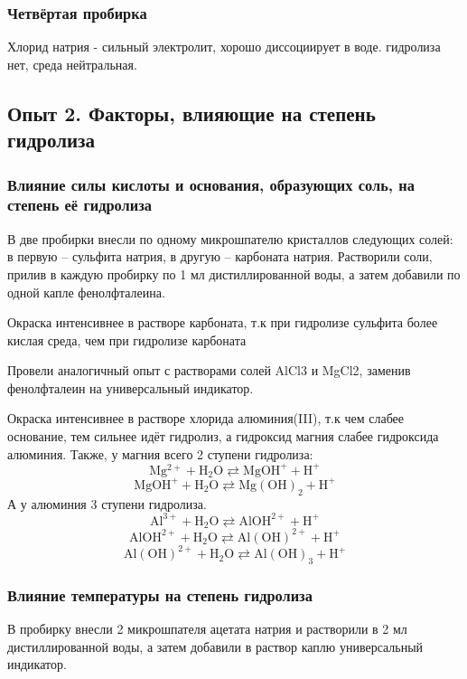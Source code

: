 \documentclass[a4paper,12pt]{article}
\begin{document}
\subsubsection{Четвёртая пробирка}
Хлорид натрия - сильный электролит, хорошо диссоциирует в воде. гидролиза нет, среда нейтральная.
\subsection{Опыт 2. Факторы, влияющие на степень гидролиза}
\subsubsection{Влияние силы кислоты и основания, образующих соль, на степень её гидролиза}
В две пробирки внесли по одному микрошпателю кристаллов следующих солей: в
первую – сульфита натрия, в другую – карбоната натрия. Растворили соли, прилив в
каждую пробирку по 1 мл дистиллированной воды, а затем добавили по одной капле
фенолфталеина.

Окраска интенсивнее в растворе карбоната, т.к при гидролизе сульфита более кислая среда, чем при гидролизе карбоната

Провели аналогичный опыт с растворами солей AlCl3 и MgCl2, заменив
фенолфталеин на универсальный индикатор.

Окраска интенсивнее в растворе хлорида алюминия(III), т.к чем слабее основание, тем сильнее идёт гидролиз, а гидроксид магния слабее гидроксида алюминия. Также, у магния всего 2 ступени гидролиза:
\begin{equation}
\mathrm{Mg^{2+} + H_2O \rightleftarrows MgOH^+ + H^+ }
\end{equation}
\begin{equation}
\mathrm{MgOH^+ + H_2O \rightleftarrows Mg(OH)_2 + H^+}
\end{equation}
А у алюминия 3 ступени гидролиза.
\begin{equation}
\mathrm{Al^{3+} + H_2O \rightleftarrows AlOH^{2+} + H^+}
\end{equation}
\begin{equation}
\mathrm{AlOH^{2+} + H_2O \rightleftarrows Al(OH)^{2+} + H^+}
\end{equation}
\begin{equation}
\mathrm{Al(OH)^{2+} + H_2O \rightleftarrows Al(OH)_3 + H^+}
\end{equation}
\subsubsection{Влияние температуры на степень гидролиза}
В пробирку внесли 2 микрошпателя ацетата натрия и растворили в 2 мл
дистиллированной воды, а затем добавили в раствор каплю универсальный индикатор. 
\end{document}
